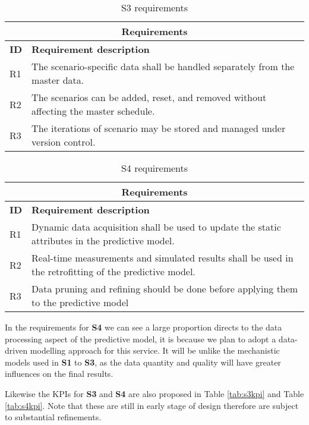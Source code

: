 \begin{table}[hbt!]
\centering
\begin{tabularx}{\textwidth}{|p{1cm}|X|}
\hline
\multicolumn{2}{|c|}{\textbf{Requirements}} \\
\hline
\textbf{ID} & \textbf{Requirement description} \\ 
\hline            
R1 & The scenario-specific data shall be handled separately from the master data. \\ 
\hline
R2 & The scenarios can be added, reset, and removed without affecting the master schedule. \\ 
\hline
R3 & The iterations of scenario may be stored and managed under version control.\\ 
\hline
\end{tabularx}
\caption{S3 requirements}
\label{tab:s3req}
\end{table}

\begin{table}[hbt!]
\centering
\begin{tabularx}{\textwidth}{|p{1cm}|X|}
\hline
\multicolumn{2}{|c|}{\textbf{Requirements}} \\
\hline
\textbf{ID} & \textbf{Requirement description} \\ 
\hline            
R1 & Dynamic data acquisition shall be used to update the static attributes in the predictive model. \\ 
\hline
R2 & Real-time measurements and simulated results shall be used in the retrofitting of the predictive model. \\ 
\hline
R3 & Data pruning and refining should be done before applying them to the predictive model \\ 
\hline
\end{tabularx}
\caption{S4 requirements}
\label{tab:s4req}
\end{table}

In the requirements for \textbf{S4} we can see a large proportion directs to the data processing aspect of the predictive model, it is because we plan to adopt a data-driven modelling approach for this service. It will be unlike the mechanistic models used in \textbf{S1} to \textbf{S3}, as the data quantity and quality will have greater influences on the final results.

\newpage
Likewise the KPIs for \textbf{S3} and \textbf{S4} are also proposed in Table \ref{tab:s3kpi} and Table \ref{tab:s4kpi}. Note that these are still in early stage of design therefore are subject to substantial refinements.


